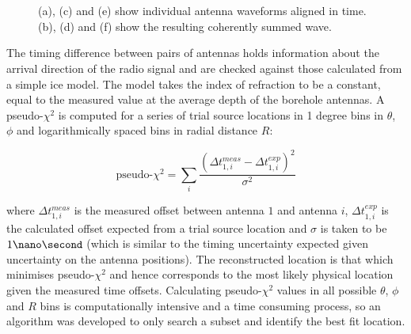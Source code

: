 \begin{figure}[htpb]
  \hfill
  \\
  \hfill
  \\
  \hfill
  \caption{(a), (c) and (e) show individual antenna waveforms aligned in time. (b), (d) and (f) show the resulting coherently summed wave.} 
  \label{fig:analysis:Reconstruction:CSW-Example}
\end{figure}


The timing difference between pairs of antennas holds information about the arrival direction of the radio signal and are checked against those calculated from a simple ice model. The model takes the index of refraction to be a constant, equal to the measured value at the average depth of the borehole antennas. A pseudo-$\chi^{2}$ is computed for a series of trial source locations in 1 degree bins in $\theta$, $\phi$ and logarithmically spaced bins in radial distance $R$:

\begin{equation}
  \mbox{pseudo-}\chi^{2} = \sum_{i} \frac{(\Delta t_{1,i}^{meas} - \Delta t_{1,i}^{exp})^{2}}{\sigma^{2}}
  \label{eq:analysis:Reconstruction:ChiSq}
\end{equation}


\noindent  where $\Delta t_{1,i}^{meas}$ is the measured offset between antenna $1$ and antenna $i$, $\Delta t_{1,i}^{exp}$ is the calculated offset expected from a trial source location and $\sigma$ is taken to be $1 \nano \second$ (which is similar to the timing uncertainty expected given uncertainty on the antenna positions). The reconstructed location is that which minimises pseudo-$\chi^{2}$ and hence corresponds to the most likely physical location given the measured time offsets. Calculating pseudo-$\chi^{2}$ values in all possible $\theta$, $\phi$ and $R$ bins is computationally intensive and a time consuming process, so an algorithm was developed to only search a subset and identify the best fit location.


